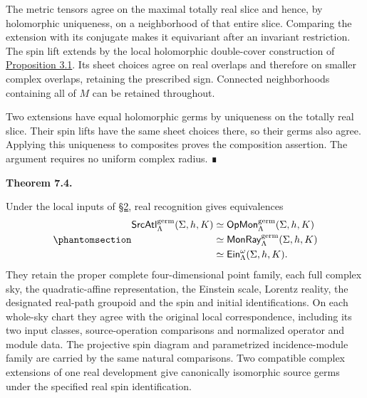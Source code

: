 \documentclass[
  english,
  11pt,
  reqno]{amsart}
\makeatletter
\newcommand{\pandocstatementheading}[1]{%
  \par\addpenalty{\@beginparpenalty}%
  \addvspace{.5\baselineskip plus .2\baselineskip minus .2\baselineskip}%
  {\normalfont\bfseries #1\par}%
  \nobreak\@afterindenttrue\@afterheading
}
\makeatother
\begin{document}
The metric tensors agree on the maximal totally real slice and hence, by
holomorphic uniqueness, on a neighborhood of that entire slice.
Comparing the extension with its conjugate makes it equivariant after an
invariant restriction. The spin lift extends by the local holomorphic
double-cover construction of
\hyperref[prop:einstein-complexification-phase]{Proposition 3.1}. Its
sheet choices agree on real overlaps and therefore on smaller complex
overlaps, retaining the prescribed sign. Connected neighborhoods
containing all of \(M\) can be retained throughout.

Two extensions have equal holomorphic germs by uniqueness on the totally
real slice. Their spin lifts have the same sheet choices there, so their
germs also agree. Applying this uniqueness to composites proves the
composition assertion. The argument requires no uniform complex radius.
∎

\pandocstatementheading{\protect{}\label{thm:source-atlas-cauchy-equivalence-v08}Theorem 7.4.}

Under the local inputs of \hyperref[sec:local-input-v08]{§2}, real
recognition gives equivalences
\begin{equation}\protect\phantomsection\label{eq:source-atlas-cauchy-equivalence-v08}{\begin{aligned}
\mathsf{SrcAtl}^{\mathrm{germ}}_\Lambda(\Sigma,h,K)&\simeq
\mathsf{OpMon}^{\mathrm{germ}}_\Lambda(\Sigma,h,K) \\
&\simeq
\mathsf{MonRay}^{\mathrm{germ}}_\Lambda(\Sigma,h,K) \\
&\simeq
\mathsf{Ein}^{\omega}_\Lambda(\Sigma,h,K).
\end{aligned}}\end{equation} They retain the proper complete four-dimensional point
family, each full complex sky, the quadratic-affine representation, the
Einstein scale, Lorentz reality, the designated real-path groupoid and
the spin and initial identifications. On each whole-sky chart they agree
with the original local correspondence, including its two input classes,
source-operation comparisons and normalized operator and module data.
The projective spin diagram and parametrized incidence-module family are
carried by the same natural comparisons. Two compatible complex
extensions of one real development give canonically isomorphic source
germs under the specified real spin identification.
\end{document}
